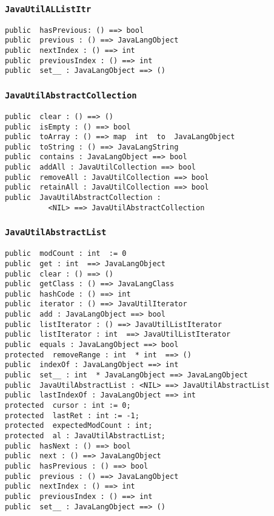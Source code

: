 \documentclass[\pformat,12pt]{article}
\begin{document}
\subsubsection{\texttt{JavaUtilALListItr}}
\begin{small}
\begin{verbatim}
public  hasPrevious: () ==> bool
public  previous : () ==> JavaLangObject
public  nextIndex : () ==> int
public  previousIndex : () ==> int
public  set__ : JavaLangObject ==> ()
\end{verbatim}
\end{small}

\subsubsection{\texttt{JavaUtilAbstractCollection}}
\begin{small}
\begin{verbatim}
public  clear : () ==> ()
public  isEmpty : () ==> bool
public  toArray : () ==> map  int  to  JavaLangObject
public  toString : () ==> JavaLangString
public  contains : JavaLangObject ==> bool
public  addAll : JavaUtilCollection ==> bool
public  removeAll : JavaUtilCollection ==> bool
public  retainAll : JavaUtilCollection ==> bool
public  JavaUtilAbstractCollection : 
          <NIL> ==> JavaUtilAbstractCollection
\end{verbatim}
\end{small}

\subsubsection{\texttt{JavaUtilAbstractList}}
\begin{small}
\begin{verbatim}
public  modCount : int  := 0
public  get : int  ==> JavaLangObject
public  clear : () ==> ()
public  getClass : () ==> JavaLangClass
public  hashCode : () ==> int
public  iterator : () ==> JavaUtilIterator
public  add : JavaLangObject ==> bool
public  listIterator : () ==> JavaUtilListIterator
public  listIterator : int  ==> JavaUtilListIterator
public  equals : JavaLangObject ==> bool
protected  removeRange : int  * int  ==> ()
public  indexOf : JavaLangObject ==> int
public  set__ : int  * JavaLangObject ==> JavaLangObject
public  JavaUtilAbstractList : <NIL> ==> JavaUtilAbstractList
public  lastIndexOf : JavaLangObject ==> int
protected  cursor : int := 0;
protected  lastRet : int := -1;
protected  expectedModCount : int;
protected  al : JavaUtilAbstractList;
public  hasNext : () ==> bool
public  next : () ==> JavaLangObject
public  hasPrevious : () ==> bool
public  previous : () ==> JavaLangObject
public  nextIndex : () ==> int
public  previousIndex : () ==> int
public  set__ : JavaLangObject ==> ()
\end{verbatim}
\end{small}
\end{document}

